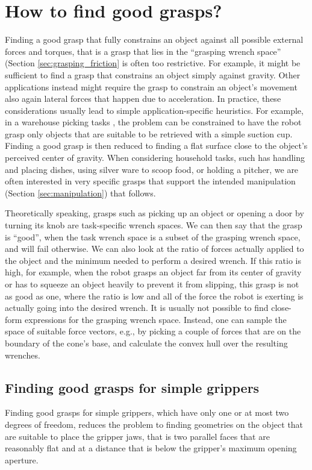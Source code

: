 \section{How to find good grasps?}

Finding a good grasp that fully constrains an object against all possible external forces and torques, that is a grasp that lies in the ``grasping wrench space'' (Section \ref{sec:grasping_friction} is often too restrictive. For example, it might be sufficient to find a grasp that constrains an object simply against gravity. Other applications instead might require the grasp to constrain an object's movement also again lateral forces that happen due to acceleration. In practice, these considerations usually lead to simple application-specific heuristics. For example, in a warehouse picking tasks \cite{correll2016analysis}, the problem can be constrained to have the robot grasp only objects that are suitable to be retrieved with a simple suction cup. Finding a good grasp is then reduced to finding a flat surface close to the object's perceived center of gravity. When considering household tasks, such has handling and placing dishes, using silver ware to scoop food, or holding a pitcher, we are often interested in very specific grasps that support the intended manipulation (Section \ref{sec:manipulation}) that follows. 

Theoretically speaking, grasps such as picking up an object or opening a door by turning its knob are task-specific wrench spaces. We can then say that the grasp is ``good'', when the task wrench space is a subset of the grasping wrench space, and will fail otherwise. We can also look at the ratio of forces actually applied to the object and the minimum needed to perform a desired wrench. If this ratio is high, for example, when the robot grasps an object far from its center of gravity or has to squeeze an object heavily to prevent it from slipping, this grasp is not as good as one, where the ratio is low and all of the force the robot is exerting is actually going into the desired wrench. It is usually not possible to find close-form expressions for the grasping wrench space. Instead, one can sample the space of suitable force vectors, e.g., by picking a couple of forces that are on the boundary of the cone's base, and calculate the convex hull over the resulting wrenches.

\subsection{Finding good grasps for simple grippers}
Finding good grasps for simple grippers, which have only one or at most two degrees of freedom, reduces the problem to finding geometries on the object that are suitable to place the gripper jaws, that is two parallel faces that are reasonably flat and at a distance that is below the gripper's maximum opening aperture. 

